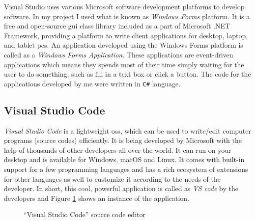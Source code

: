 \documentclass[a4paper,12pt]{report}%
\begin{document}
Visual Studio uses various Microsoft software development platforms to develop software. In my project I used what is known as \textit{Windows Forms} platform. It is a free and open-source \ac{gui} class library included as a part of Microsoft .NET Framework, providing a platform to write client applications for desktop, laptop, and tablet \ac{pc}s. An application developed using the Windows Forms platform is called as a \textit{Windows Forms Application}. These applications are event-driven applications which means they spends most of their time simply waiting for the user to do something, such as fill in a text box or click a button\cite{winforms}. The code for the applications developed by me were written in {\tt C\#} language.


\subsection{Visual Studio Code}

\textit{Visual Studio Code} is a lightweight \ac{oss}, which can be used to write/edit computer programs (source codes) efficiently. It is being developed by Microsoft with the help of thousands of other developers all over the world. It can run on your desktop and is available for Windows, macOS and Linux. It comes with built-in support for a few programming languages and has a rich ecosystem of extensions for other languages as well to customize it according to the needs of the developer. In short, this cool, powerful application is called as \textit{VS code} by the developers and Figure \ref{fig:vscode} shows an instance of the application.\\

\begin{figure}[H]
	\centering
	\caption{``Visual Studio Code'' source code editor}
	\label{fig:vscode}
\end{figure}
\end{document}
